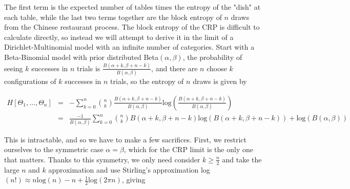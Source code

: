 \documentclass[11pt]{article}
\newcommand{\Log}{\mathrm{log}}
\begin{document}
The first term is the expected number of tables times the entropy of the "dish" at each table, while the last two terms together are the block entropy of $n$ draws from the Chinese restaurant process.  The block entropy of the CRP is difficult to calculate directly, so instead we will attempt to derive it in the limit of a Dirichlet-Multinomial model with an infinite number of categories.  Start with a Beta-Binomial model with prior distributed Beta$(\alpha,\beta)$, the probability of seeing $k$ successes in $n$ trials is $\frac{B(\alpha+k,\beta+n-k)}{B(\alpha,\beta)}$, and there are $n$ choose $k$ configurations of $k$ successes in $n$ trials, so the entropy of $n$ draws is given by

\begin{eqnarray*}
H[\Theta_1,\ldots,\Theta_n] & = & -\sum_{k=0}^n {n \choose k} \frac{B(\alpha+k,\beta+n-k)}{B(\alpha,\beta)}\Log\left(\frac{B(\alpha+k,\beta+n-k)}{B(\alpha,\beta)}\right) \\
& = & \frac{-1}{B(\alpha,\beta)}\sum_{k=0}^n {n \choose k} B(\alpha+k,\beta+n-k)\Log\left(B(\alpha+k,\beta+n-k)\right) + \Log(B(\alpha,\beta))
\end{eqnarray*}

This is intractable, and so we have to make a few sacrifices.  First, we restrict ourselves to the symmetric case $\alpha=\beta$, which for the CRP limit is the only one that matters.  Thanks to this symmetry, we only need consider $k\ge\frac{n}{2}$ and take the large $n$ and $k$ approximation and use Stirling's approximation log$(n!) \approx n\Log(n) - n + \frac{1}{2}\Log(2\pi n)$, giving

 



\end{document}
